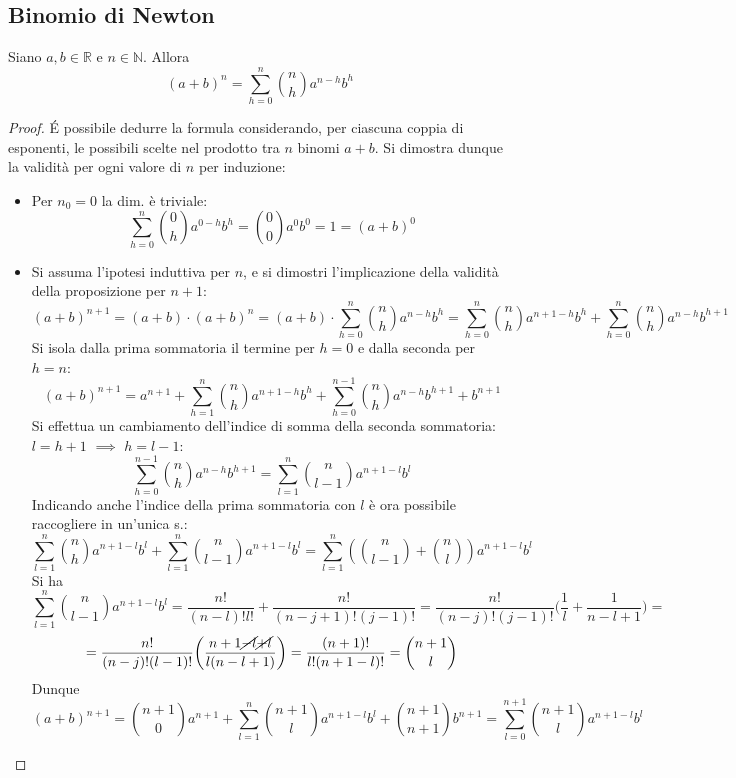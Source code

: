 \documentclass[10pt]{article}
\theoremstyle{plain}
\begin{document}
\subsection{Binomio di Newton}
\begin{prop}
    Siano $a, b \in \mathbb{R}$ e $n \in \mathbb{N}$. Allora 
    \[(a+b)^n = \sum \limits_{h = 0}^n \binom{n}{h} a^{n - h} b^h\]
\end{prop}
\begin{proof}
    \'E possibile dedurre la formula considerando, per ciascuna coppia di esponenti, le possibili scelte nel prodotto tra $n$ binomi $a+b$. Si dimostra dunque la validità per ogni valore di $n$ per induzione:
    \begin{itemize}
        \item Per $n_0 = 0$ la dim. è triviale: 
        \[\sum \limits_{h = 0}^n \binom{0}{h} a^{0 - h} b^h = \binom{0}{0} a^0 b^0 = 1 = (a+b)^0\]
        \item Si assuma l'ipotesi induttiva per $n$, e si dimostri l'implicazione della validità della proposizione per $n+1$:
        \[(a+b)^{n+1} = (a+b) \cdot (a+b)^n = (a+b) \cdot \sum \limits_{h = 0}^n \binom{n}{h} a^{n - h} b^h = \sum \limits_{h = 0}^n \binom{n}{h} a^{n + 1 - h} b^h + \sum \limits_{h = 0}^n \binom{n}{h} a^{n - h} b^{h + 1}\]
        Si isola dalla prima sommatoria il termine per $h = 0$ e dalla seconda per $h = n$:
        \[(a+b)^{n+1} = a^{n+1} + \sum \limits_{h = 1}^n \binom{n}{h} a^{n + 1 - h} b^h + \sum \limits_{h = 0}^{n-1} \binom{n}{h} a^{n - h} b^{h +1} + b^{n+1}\]
        Si effettua un cambiamento dell'indice di somma della seconda sommatoria: $l = h+1$ $\implies$ $h = l-1$:
        \[\sum \limits_{h = 0}^{n-1} \binom{n}{h} a^{n - h} b^{h +1} = \sum \limits_{l = 1}^{n} \binom{n}{l -1} a^{n + 1 - l} b^{l}\]
        Indicando anche l'indice della prima sommatoria con $l$ è ora possibile raccogliere in un'unica s.:
        \[\sum \limits_{l = 1}^n \binom{n}{h} a^{n + 1 - l} b^l +  \sum \limits_{l = 1}^{n} \binom{n}{l -1} a^{n + 1 - l} b^{l} =  \sum \limits_{l = 1}^{n} (\binom{n}{l -1} + \binom{n}{l}) a^{n + 1 - l} b^{l}\]
        Si ha
        \[ \sum \limits_{l = 1}^{n} \binom{n}{l -1} a^{n + 1 - l} b^{l} = \frac{n!}{(n-l)! l!} + \frac{n!}{(n-j+1)! (j-1)!} = \frac{n!}{(n-j)! (j-1)!} \bigg( \frac{1}{l} + \frac{1}{n-l+1}\bigg) = \]
    \[= \frac{n!}{(n-j)! (l-1)!} \bigg( \frac{n+1 \cancel{-l} \cancel{+l}}{l (n-l+1)} \bigg) = \frac{(n+1)!}{l! (n+1-l)!} = \binom{n+1}{l}\]
    Dunque
    \[(a+b)^{n+1} = \binom{n+1}{0} a^{n+1} + \sum \limits_{l = 1}^n \binom{n+1}{l} a^{n + 1 - l} b^l + \binom{n+1}{n+1} b^{n+1} = \sum \limits_{l = 0}^{n+1} \binom{n+1}{l} a^{n + 1 - l} b^l\]
    \end{itemize}
\end{proof}
\end{document}
